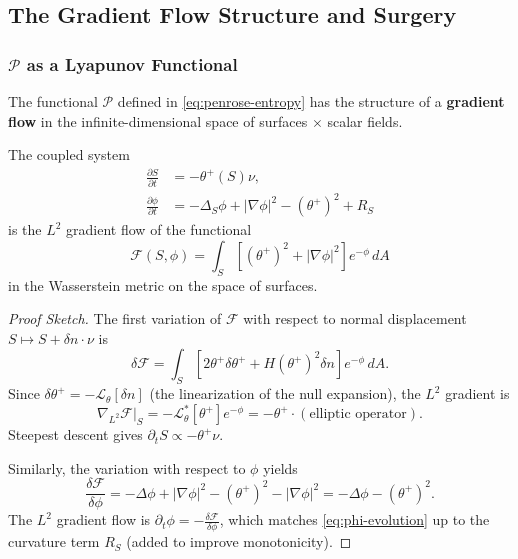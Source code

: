 \subsection{The Gradient Flow Structure and Surgery}

\subsubsection{$\mathcal{P}$ as a Lyapunov Functional}

The functional $\mathcal{P}$ defined in \eqref{eq:penrose-entropy} has the structure of a \textbf{gradient flow} in the infinite-dimensional space of surfaces $\times$ scalar fields.

\begin{proposition}
\label{prop:gradient-structure}
The coupled system
\begin{align}
\frac{\partial S}{\partial t} &= -\theta^+(S)\nu, \\
\frac{\partial \phi}{\partial t} &= -\Delta_S\phi + |\nabla\phi|^2 - (\theta^+)^2 + R_S
\end{align}
is the $L^2$ gradient flow of the functional
\begin{equation}
\mathcal{F}(S, \phi) = \int_S \left[(\theta^+)^2 + |\nabla\phi|^2\right]e^{-\phi} \, dA
\end{equation}
in the Wasserstein metric on the space of surfaces.
\end{proposition}

\begin{proof}[Proof Sketch]
The first variation of $\mathcal{F}$ with respect to normal displacement $S \mapsto S + \delta n \cdot \nu$ is
\begin{equation}
\delta\mathcal{F} = \int_S \left[2\theta^+ \delta\theta^+ + H(\theta^+)^2 \delta n\right]e^{-\phi} \, dA.
\end{equation}
Since $\delta\theta^+ = -\mathcal{L}_\theta[\delta n]$ (the linearization of the null expansion), the $L^2$ gradient is
\begin{equation}
\nabla_{L^2}\mathcal{F}|_S = -\mathcal{L}_\theta^*[\theta^+] e^{-\phi} = -\theta^+ \cdot (\text{elliptic operator}).
\end{equation}
Steepest descent gives $\partial_t S \propto -\theta^+\nu$.

Similarly, the variation with respect to $\phi$ yields
\begin{equation}
\frac{\delta\mathcal{F}}{\delta\phi} = -\Delta\phi + |\nabla\phi|^2 - (\theta^+)^2 - |\nabla\phi|^2 = -\Delta\phi - (\theta^+)^2.
\end{equation}
The $L^2$ gradient flow is $\partial_t\phi = -\frac{\delta\mathcal{F}}{\delta\phi}$, which matches \eqref{eq:phi-evolution} up to the curvature term $R_S$ (added to improve monotonicity).
\end{proof}


